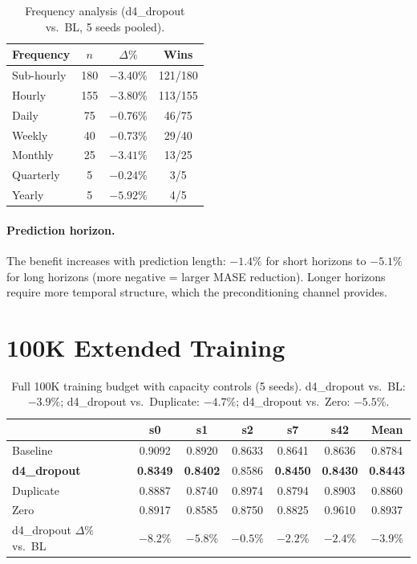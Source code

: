 \documentclass[11pt]{article}
\theoremstyle{plain}
\theoremstyle{definition}
\theoremstyle{remark}
\newcommand{\HD}{\textsf{d4\_dropout}}
\begin{document}
\begin{table}[h]
\centering
\caption{Frequency analysis (\HD{} vs.\ BL, 5 seeds pooled).}
\small
\begin{tabular}{lccc}
\toprule
\textbf{Frequency} & \textbf{$n$} & \textbf{$\Delta\%$} & \textbf{Wins} \\
\midrule
Sub-hourly & 180 & $-3.40\%$ & 121/180 \\
Hourly & 155 & $-3.80\%$ & 113/155 \\
Daily & 75 & $-0.76\%$ & 46/75 \\
Weekly & 40 & $-0.73\%$ & 29/40 \\
Monthly & 25 & $-3.41\%$ & 13/25 \\
Quarterly & 5 & $-0.24\%$ & 3/5 \\
Yearly & 5 & $-5.92\%$ & 4/5 \\
\bottomrule
\end{tabular}
\end{table}

\paragraph{Prediction horizon.} The benefit increases with prediction length: $-1.4\%$ for short horizons to $-5.1\%$ for long horizons (more negative = larger MASE reduction). Longer horizons require more temporal structure, which the preconditioning channel provides.

\section{100K Extended Training}
\label{app:100k}

\begin{table}[h]
\centering
\caption{Full 100K training budget with capacity controls (5 seeds). \HD{} vs.\ BL: $-3.9\%$; \HD{} vs.\ Duplicate: $-4.7\%$; \HD{} vs.\ Zero: $-5.5\%$.}
\small
\begin{tabular}{lcccccc}
\toprule
& \textbf{s0} & \textbf{s1} & \textbf{s2} & \textbf{s7} & \textbf{s42} & \textbf{Mean} \\
\midrule
Baseline & 0.9092 & 0.8920 & 0.8633 & 0.8641 & 0.8636 & 0.8784 \\
\textbf{\HD} & \textbf{0.8349} & \textbf{0.8402} & 0.8586 & \textbf{0.8450} & \textbf{0.8430} & \textbf{0.8443} \\
Duplicate & 0.8887 & 0.8740 & 0.8974 & 0.8794 & 0.8903 & 0.8860 \\
Zero & 0.8917 & 0.8585 & 0.8750 & 0.8825 & 0.9610 & 0.8937 \\
\midrule
\HD{} $\Delta\%$ vs.\ BL & $-8.2\%$ & $-5.8\%$ & $-0.5\%$ & $-2.2\%$ & $-2.4\%$ & $-3.9\%$ \\
\bottomrule
\end{tabular}
\end{table}
\end{document}
